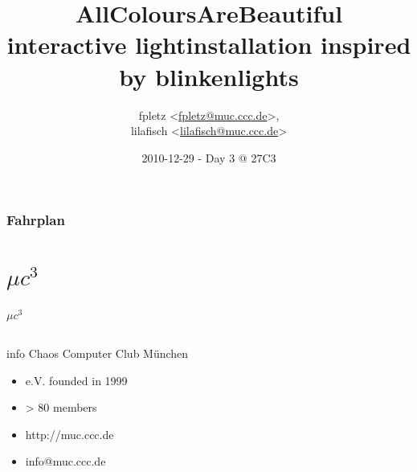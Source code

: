 \documentclass{beamer}
\title[AllColoursAreBeautiful]{AllColoursAreBeautiful\\ interactive lightinstallation inspired by blinkenlights}
\author[fpletz, lilafisch]{fpletz <\url{fpletz@muc.ccc.de}>,\\ lilafisch <\url{lilafisch@muc.ccc.de}>}
\institute[$\mu c^{3}$]{CCC Munich ($\mu c^{3}$)}
\date{2010-12-29 - Day 3 @ 27C3}
\begin{document}
\begin{frame}
\titlepage
\end{frame}

\begin{frame}
\frametitle{Fahrplan}
\tableofcontents
\end{frame}
\setlength\fboxsep{5pt}
\setlength\fboxrule{0pt}
\section{$\mu c^{3}$}
  \begin{frame}{$\mu c^{3}$}
    \begin{columns}%
      \begin{column}{5cm}
        \begin{block}{info}
         Chaos Computer Club M\"unchen
               \begin{itemize}
            \item e.V. founded in 1999
            \item > 80 members
                  \item http://muc.ccc.de
                  \item info@muc.ccc.de
            \end{itemize}
        \end{block}


\end{column}
\end{columns}
\end{frame}
\end{document}
